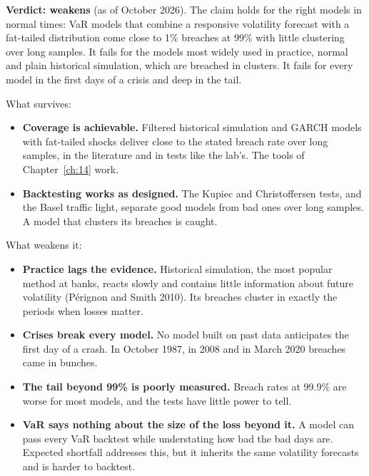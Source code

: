 \begin{callout}
\textbf{Verdict: weakens} (as of October 2026). The claim holds for the right models in normal times: VaR models that combine a responsive volatility forecast with a fat-tailed distribution come close to 1\% breaches at 99\% with little clustering over long samples. It fails for the models most widely used in practice, normal and plain historical simulation, which are breached in clusters. It fails for every model in the first days of a crisis and deep in the tail.
\end{callout}

What survives:

\begin{itemize}
  \item \textbf{Coverage is achievable.} Filtered historical simulation and GARCH models with fat-tailed shocks deliver close to the stated breach rate over long samples, in the literature and in tests like the lab's. The tools of Chapter~\ref{ch:14} work.
  \item \textbf{Backtesting works as designed.} The Kupiec and Christoffersen tests, and the Basel traffic light, separate good models from bad ones over long samples. A model that clusters its breaches is caught.
\end{itemize}

What weakens it:

\begin{itemize}
  \item \textbf{Practice lags the evidence.} Historical simulation, the most popular method at banks, reacts slowly and contains little information about future volatility (P\'erignon and Smith 2010). Its breaches cluster in exactly the periods when losses matter.
  \item \textbf{Crises break every model.} No model built on past data anticipates the first day of a crash. In October 1987, in 2008 and in March 2020 breaches came in bunches.
  \item \textbf{The tail beyond 99\% is poorly measured.} Breach rates at 99.9\% are worse for most models, and the tests have little power to tell.
  \item \textbf{VaR says nothing about the size of the loss beyond it.} A model can pass every VaR backtest while understating how bad the bad days are. Expected shortfall addresses this, but it inherits the same volatility forecasts and is harder to backtest.
\end{itemize}

